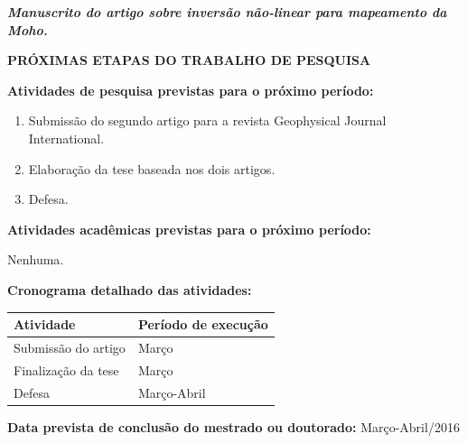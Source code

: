\documentclass[12pt,a4paper]{article}
\begin{document}
\bigskip
\bigskip

{\centering\bfseries\itshape
Manuscrito do artigo sobre inversão não-linear para mapeamento da Moho.
\par}







\newpage

\begin{center}
\textbf{\large PRÓXIMAS ETAPAS DO TRABALHO DE PESQUISA}
\end{center}

\vspace{0.5cm}

\begin{flushleft}

\textbf{Atividades de pesquisa previstas para o próximo período:}

\begin{enumerate}
    \item Submissão do segundo artigo para a revista Geophysical Journal
        International.
    \item Elaboração da tese baseada nos dois artigos.
    \item Defesa.
\end{enumerate}

\textbf{Atividades acadêmicas previstas para o próximo período:}

\bigskip

Nenhuma.

\bigskip

\textbf{Cronograma detalhado das atividades:}

\begin{center}
\begin{tabular}{l|l}
    \toprule
    \textbf{Atividade} & \textbf{Período de execução} \\
    \midrule
    Submissão do artigo & Março\\
    Finalização da tese & Março\\
    Defesa & Março-Abril\\
    \bottomrule
\end{tabular}
\end{center}


\bigskip

\textbf{Data prevista de conclusão do mestrado ou doutorado:} Março-Abril/2016

\end{flushleft}
\end{document}
